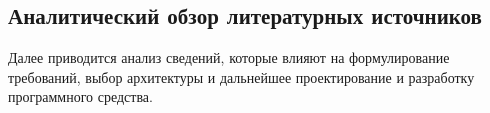 \subsection{Аналитический обзор литературных источников}
\label{sec:analysis:research}

Далее приводится анализ сведений, которые влияют на формулирование требований, выбор архитектуры и дальнейшее проектирование и разработку программного средства.

